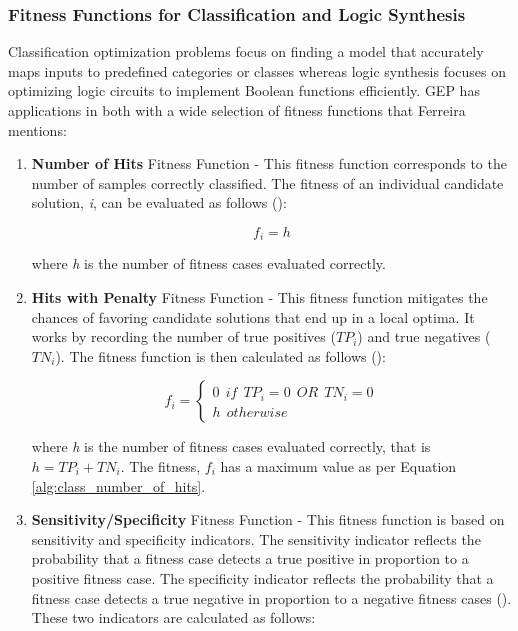 \subsubsection{Fitness Functions for Classification and Logic Synthesis}
Classification optimization problems focus on finding a model that accurately maps inputs to predefined categories or classes whereas logic synthesis focuses on optimizing logic circuits to implement Boolean functions efficiently. GEP has applications in both with a wide selection of fitness functions that Ferreira mentions:

\begin{enumerate}
    \item \textbf{Number of Hits} Fitness Function - This fitness function corresponds to the number of samples correctly classified. The fitness of an individual candidate solution, \textit{i}, can be evaluated as follows (\cite{ferreira2006gene}):
    
    \begin{equation}\label{alg:class_number_of_hits}
        f_i = h
    \end{equation}

    \noindent where \textit{h} is the number of fitness cases evaluated correctly.

    \item \textbf{Hits with Penalty} Fitness Function - This fitness function mitigates the chances of favoring candidate solutions that end up in a local optima. It works by recording the number of true positives (\textit{$TP_i$}) and true negatives (\textit{$TN_i$}). The fitness function is then calculated as follows (\cite{ferreira2006gene}):
    
    \begin{equation}\label{alg:class_hits_with_penalty}
        f_{i} =
        \begin{cases} 
            0 \:\: if \:\: TP_i=0\:\:OR\:\:TN_i=0 \\
            h \:\: otherwise
        \end{cases}
    \end{equation}

    \noindent where \textit{h} is the number of fitness cases evaluated correctly, that is $h = TP_i + TN_i$. The fitness, \textit{$f_i$} has a maximum value as per Equation \ref{alg:class_number_of_hits}.

    \item \textbf{Sensitivity/Specificity} Fitness Function - This fitness function is based on sensitivity and specificity indicators. The sensitivity indicator reflects the probability that a fitness case detects a true positive in proportion to a positive fitness case. The specificity indicator reflects the probability that a fitness case detects a true negative in proportion to a negative fitness cases (\cite{ferreira2006gene}). These two indicators are calculated as follows:
    

\end{enumerate}

